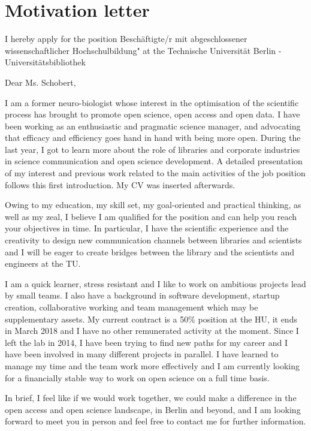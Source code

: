 \section* {Motivation letter}

I hereby apply for the position Besch\"{a}ftigte/r mit abgeschlossener wissenschaftlicher Hochschulbildung" at the Technische Universit\"{a}t Berlin - Universit\"{a}tsbibliothek
\vspace {0.5cm} 

Dear Ms. Schobert,

I am a former neuro-biologist whose interest in the optimisation of the scientific process has brought to promote open science, open access and open data. I have been working as an enthusiastic and pragmatic science manager, and advocating that efficacy and efficiency goes hand in hand with being more open. During the last year, I got to learn more about the role of libraries and corporate industries in science communication and open science development. A detailed presentation of 
 my interest and previous work related to the main activities of the job position follows this first introduction. My CV was inserted afterwards.


Owing to my education, my skill set, my goal-oriented and practical thinking, as well as my zeal, I believe I am qualified for the position and can help you reach your objectives in time. In particular, I have the scientific experience and the creativity to design new communication channels between libraries and scientists and I will be eager to create bridges between the library and the scientists and engineers at the TU.

 

I am  a quick learner, stress resistant and I like to work on ambitious projects lead by small teams. I also have a background in software development, startup creation, collaborative working and team management which may be supplementary assets. My current contract is a 50\% position at the HU, it ends in March 2018 and I have no other remunerated activity at the moment. 
Since I left the lab in 2014, I have been trying to find new paths for my career and I have been involved in many different projects in parallel. I have learned to manage my time and the team work more effectively and I am currently looking for a financially stable way to work on open science on a full time basis. 

In brief, I feel like if we would work together, we could make a difference in the open access and open science landscape, in Berlin and beyond,
and I am looking forward to meet you in person and feel free to contact me for further information.


